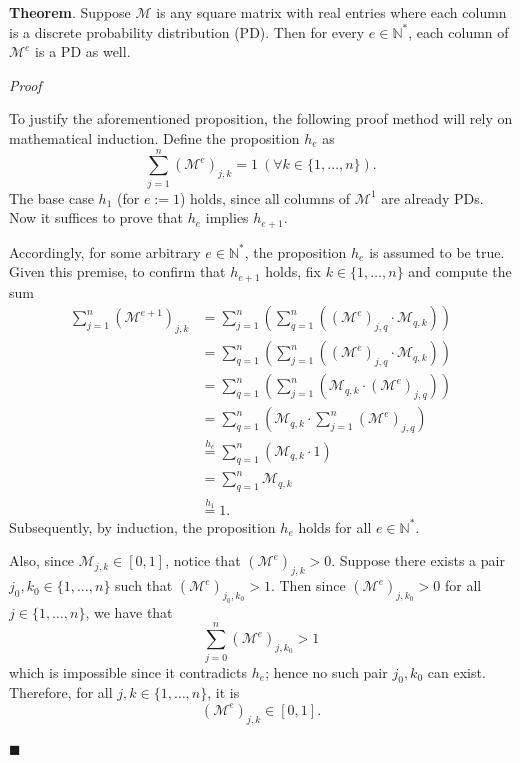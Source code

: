 \appendix
{}
\label{appendix:proofExp}

\textbf{Theorem}. Suppose \(\mathcal{M}\) is any square matrix with real entries where each column is a discrete probability distribution (PD). Then for every \(e \in \mathbb{N}^*\), each column of \(\mathcal{M}^e\) is a PD as well.

\textit{Proof}

To justify the aforementioned proposition, the following proof method will rely on mathematical induction. Define the proposition \(h_{e}\) as
\[
  \sum_{j = 1}^{n} (\mathcal{M}^e)_{j, k} = 1 \ \left( \forall k \in \{ 1, \dots, n \} \right).
\]
The base case \(h_1\) (for \(e:=1\)) holds, since all columns of \(\mathcal{M}^1\) are already PDs. Now it suffices to prove that \(h_{e}\) implies \(h_{e+1}\).

Accordingly, for some arbitrary \(e \in \mathbb{N}^{*}\), the proposition \(h_e\) is assumed to be true. Given this premise, to confirm that \(h_{e+1}\) holds, fix \(k \in \{ 1, \dots, n \}\) and compute the sum
\begin{align*}
  \sum_{j=1}^{n} ( \mathcal{M}^{e+1} )_{j,k}
  & = \sum_{j=1}^{n} \left( \sum_{q=1}^{n} ( (\mathcal{M}^{e})_{j,q} \cdot \mathcal{M}_{q,k} ) \right)
  \\
  & = \sum_{q=1}^{n} \left( \sum_{j=1}^{n} \left( (\mathcal{M}^{e})_{j,q} \cdot \mathcal{M}_{q,k} \right) \right)
  \\
  & = \sum_{q=1}^{n} \left( \sum_{j=1}^{n} \left( \mathcal{M}_{q,k} \cdot (\mathcal{M}^{e})_{j,q} \right) \right)
  \\
  & = \sum_{q=1}^{n} \left( \mathcal{M}_{q,k} \cdot \sum_{j=1}^{n} (\mathcal{M}^{e})_{j,q} \right)
  \\
  & \overset{h_{e}}{=} \sum_{q=1}^{n} ( \mathcal{M}_{q,k} \cdot 1 )
  \\
  & = \sum_{q=1}^{n} \mathcal{M}_{q,k}
  \\
  & \overset{h_{1}}{=} 1.
\end{align*}
Subsequently, by induction, the proposition \(h_{e}\) holds for all \(e \in \mathbb{N}^*\).

Also, since \(\mathcal{M}_{j,k} \in [0, 1]\), notice that \((\mathcal{M}^e)_{j,k} > 0\). Suppose there exists a pair \(j_0, k_0 \in \{ 1, \dots, n \}\) such that \((\mathcal{M}^{e})_{j_0, k_0} > 1\). Then since \((\mathcal{M}^e)_{j, k_0} > 0\) for all \(j \in \{ 1, \dots, n \}\), we have that
\[
  \sum_{j=0}^{n} (\mathcal{M}^{e})_{j, k_0} > 1
\]
which is impossible since it contradicts \(h_e\); hence no such pair \(j_0, k_0\) can exist. Therefore, for all \(j, k \in \{ 1, \dots, n \}\), it is
\[
  (\mathcal{M}^{e})_{j, k} \in [0, 1] .
\]

\(\blacksquare\)
